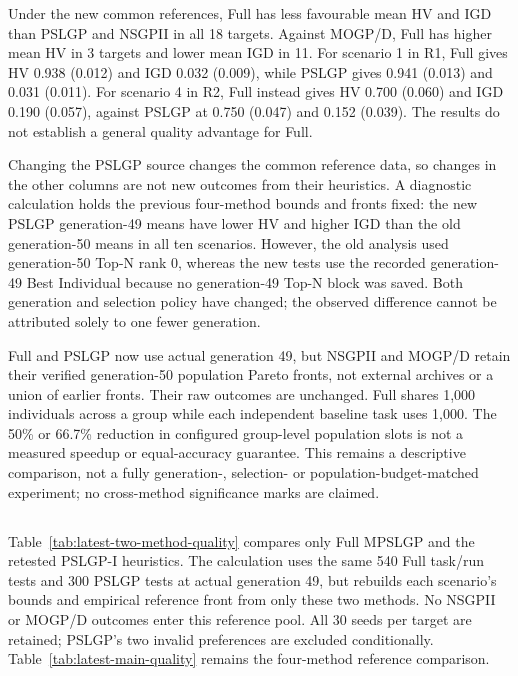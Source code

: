 Under the new common references, Full has less favourable mean HV and IGD than PSLGP and NSGPII in all 18 targets. Against MOGP/D, Full has higher mean HV in 3 targets and lower mean IGD in 11. For scenario 1 in R1, Full gives HV 0.938 (0.012) and IGD 0.032 (0.009), while PSLGP gives 0.941 (0.013) and 0.031 (0.011). For scenario 4 in R2, Full instead gives HV 0.700 (0.060) and IGD 0.190 (0.057), against PSLGP at 0.750 (0.047) and 0.152 (0.039). The results do not establish a general quality advantage for Full.

Changing the PSLGP source changes the common reference data, so changes in the other columns are not new outcomes from their heuristics. A diagnostic calculation holds the previous four-method bounds and fronts fixed: the new PSLGP generation-49 means have lower HV and higher IGD than the old generation-50 means in all ten scenarios. However, the old analysis used generation-50 Top-N rank 0, whereas the new tests use the recorded generation-49 Best Individual because no generation-49 Top-N block was saved. Both generation and selection policy have changed; the observed difference cannot be attributed solely to one fewer generation.

Full and PSLGP now use actual generation 49, but NSGPII and MOGP/D retain their verified generation-50 population Pareto fronts, not external archives or a union of earlier fronts. Their raw outcomes are unchanged. Full shares 1,000 individuals across a group while each independent baseline task uses 1,000. The 50\% or 66.7\% reduction in configured group-level population slots is not a measured speedup or equal-accuracy guarantee. This remains a descriptive comparison, not a fully generation-, selection- or population-budget-matched experiment; no cross-method significance marks are claimed.



\subsection{}
Table~\ref{tab:latest-two-method-quality} compares only Full MPSLGP and the retested PSLGP-I heuristics. The calculation uses the same 540 Full task/run tests and 300 PSLGP tests at actual generation 49, but rebuilds each scenario's bounds and empirical reference front from only these two methods. No NSGPII or MOGP/D outcomes enter this reference pool. All 30 seeds per target are retained; PSLGP's two invalid preferences are excluded conditionally. Table~\ref{tab:latest-main-quality} remains the four-method reference comparison.

